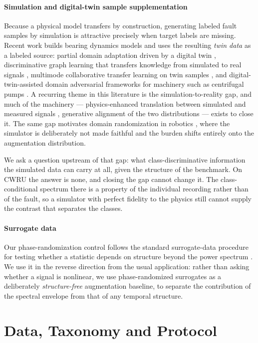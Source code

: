 \documentclass[journal]{IEEEtran}
\begin{document}
\paragraph{Simulation and digital-twin sample supplementation}
Because a physical model transfers by construction, generating labeled fault
samples by simulation is attractive precisely when target labels are missing.
Recent work builds bearing dynamics models and uses the resulting \emph{twin
data} as a labeled source: partial domain adaptation driven by a digital twin
\cite{zhang2023dt}, discriminative graph learning that transfers knowledge from
simulated to real signals \cite{xu2024dt}, multimode collaborative transfer
learning on twin samples \cite{liu2024twin}, and digital-twin-assisted domain
adversarial frameworks for machinery such as centrifugal pumps
\cite{kumar2024dt}. A recurring theme in this literature is the
simulation-to-reality gap, and much of the machinery --- physics-enhanced
translation between simulated and measured signals \cite{ming2026physics},
generative alignment of the two distributions \cite{xiao2026sim2real} --- exists
to close it. The same gap motivates domain randomization in robotics
\cite{tobin2017domain}, where the simulator is deliberately not made faithful
and the burden shifts entirely onto the augmentation distribution.

We ask a question upstream of that gap: what class-discriminative information
the simulated data can carry at all, given the structure of the benchmark. On
CWRU the answer is none, and closing the gap cannot change it. The
class-conditional spectrum there is a property of the individual recording
rather than of the fault, so a simulator with perfect fidelity to the physics
still cannot supply the contrast that separates the classes.

\paragraph{Surrogate data}
Our phase-randomization control follows the standard surrogate-data procedure
for testing whether a statistic depends on structure beyond the power spectrum
\cite{theiler1992surrogate, schreiber2000surrogate}. We use it in the reverse
direction from the usual
application: rather than asking whether a signal is nonlinear, we use
phase-randomized surrogates as a deliberately \emph{structure-free} augmentation
baseline, to separate the contribution of the spectral envelope from that of any
temporal structure.

\section{Data, Taxonomy and Protocol}
\label{sec:setup}
\end{document}
